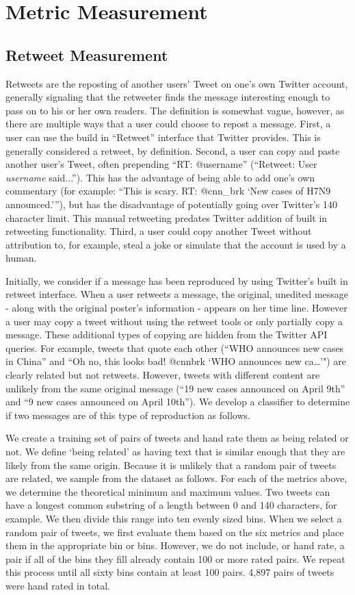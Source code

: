 \section{Metric Measurement}
\subsection{Retweet Measurement}

Retweets are the reposting of another users' Tweet on one's own Twitter account, generally signaling that the retweeter finds the message interesting enough to pass on to his or her own readers. The definition is somewhat vague, however, as there are multiple ways that a user could choose to repost a message. First, a user can use the build in ``Retweet'' interface that Twitter provides. This is generally considered a retweet, by definition. Second, a user can copy and paste another user's Tweet, often prepending ``RT: @username'' (``Retweet: User \emph{username} said...''). This has the advantage of being able to add one's own commentary (for example: ``This is scary. RT: @cnn\_brk `New cases of H7N9 announced.'''), but has the disadvantage of potentially going over Twitter's 140 character limit. This manual retweeting predates Twitter addition of built in retweeting functionality. Third, a user could copy another Tweet without attribution to, for example, steal a joke or simulate that the account is used by a human. 


Initially, we consider if a message has been reproduced by using Twitter's built in retweet interface. When a user retweets a message, the original, unedited message - along with the original poster's information - appears on her time line. However a user may copy a tweet without using the retweet tools or only partially copy a message. These additional types of copying are hidden from the Twitter API queries. For example, tweets that quote each other (``WHO announces new cases in China'' and ``Oh no, this looks bad! @cnnbrk `WHO announces new ca\ldots'") are clearly related but not retweets. However, tweets with different content are unlikely from the same original message (``19 new cases announced on April 9th'' and ``9 new cases announced on April 10th''). We develop a classifier to determine if two messages are of this type of reproduction as follows.

We create a training set of pairs of tweets and hand rate them as being related or not. We define `being related' as having text that is similar enough that they are likely from the same origin. Because it is unlikely that a random pair of tweets are related, we sample from the dataset as follows. For each of the metrics above, we determine the theoretical minimum and maximum values. Two tweets can have a longest common substring of a length between 0 and 140 characters, for example. We then divide this range into ten evenly sized bins. When we select a random pair of tweets, we first evaluate them based on the six metrics and place them in the appropriate bin or bins. However, we do not include, or hand rate, a pair if all of the bins they fill already contain 100 or more rated pairs. We repeat this process until all sixty bins contain at least 100 pairs. 4,897 pairs of tweets were hand rated in total.


